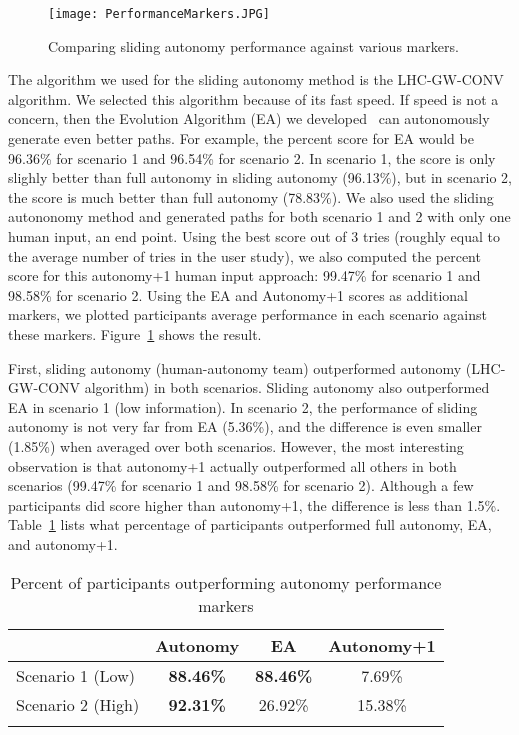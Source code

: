 \begin{figure}
\centering
\texttt{[image: PerformanceMarkers.JPG]}
\caption{Comparing sliding autonomy performance against various markers.}
\label{PerformanceMarkers}
\end{figure}

The algorithm we used for the sliding autonomy method is the LHC-GW-CONV algorithm. We selected this algorithm because of its fast speed. If speed is not a concern, then the Evolution Algorithm (EA) we developed~\cite{Lin2009UAV} can autonomously generate even better paths. For example, the percent score for EA would be 96.36\% for scenario 1 and 96.54\% for scenario 2. In scenario 1, the score is only slighly better than full autonomy in sliding autonomy (96.13\%), but in scenario 2, the score is much better than full autonomy (78.83\%). We also used the sliding autononomy method and generated paths for both scenario 1 and 2 with only one human input, an end point. Using the best score out of 3 tries (roughly equal to the average number of tries in the user study), we also computed the percent score for this autonomy+1 human input approach: 99.47\% for scenario 1 and 98.58\% for scenario 2. Using the EA and Autonomy+1 scores as additional markers, we plotted participants average performance in each scenario against these markers. Figure~\ref{PerformanceMarkers} shows the result.

First, sliding autonomy (human-autonomy team) outperformed autonomy (LHC-GW-CONV algorithm) in both scenarios. Sliding autonomy also outperformed EA in scenario 1 (low information). In scenario 2, the performance of sliding autonomy is not very far from EA (5.36\%), and the difference is even smaller (1.85\%) when averaged over both scenarios. However, the most interesting observation is that autonomy+1 actually outperformed all others in both scenarios (99.47\% for scenario 1 and 98.58\% for scenario 2). Although a few participants did score higher than autonomy+1, the difference is less than 1.5\%. Table~\ref{CompareToMarkers} lists what percentage of participants outperformed full autonomy, EA, and autonomy+1.

\begin{table}
\caption{Percent of participants outperforming autonomy performance markers}
	\centering
		\begin{tabular}
			{|l|c|c|c|}
			\hline
			 & Autonomy & EA & Autonomy+1 \\
			\hline
			Scenario 1 (Low) & \textbf{88.46\%} & \textbf{88.46\%} & 7.69\% \\
			\hline
			Scenario 2 (High) & \textbf{92.31\%} & 26.92\% & 15.38\% \\
			\hline
			\multicolumn{4}{c}{}  %
		\end{tabular}
\label{CompareToMarkers}
\end{table}

